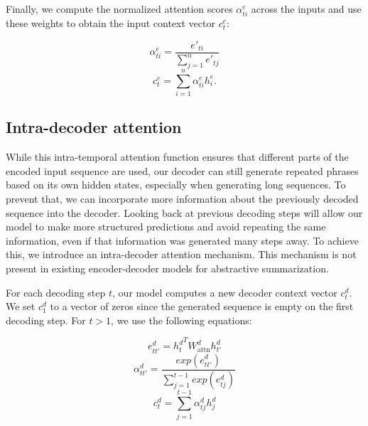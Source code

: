 \documentclass{article} \usepackage{iclr2018_arxiv,times}
\begin{document}
Finally, we compute the normalized attention scores $\alpha^e_{ti}$ across the inputs and use these weights to obtain the input context vector $c^e_t$:
\vspace{-5mm}
\begin{multicols}{2}\begin{equation}
\alpha^e_{ti} = \frac{e'_{ti}}{\sum_{j=1}^{n} e'_{tj}}
\label{eq:temporal-attention-weights-softmax}
\end{equation}\begin{equation}
c^e_t = \sum_{i=1}^{n} \alpha^e_{ti} h^e_i.
\label{eq:attention-context}
\end{equation}\end{multicols}

\subsection{Intra-decoder attention}
\label{ssec:intra-attention}

While this intra-temporal attention function ensures that different parts of the encoded input sequence are used, our decoder can still generate repeated phrases based on its own hidden states, especially when generating long sequences. To prevent that, we can incorporate more information about the previously decoded sequence into the decoder. Looking back at previous decoding steps will allow our model to make more structured predictions and avoid repeating the same information, even if that information was generated many steps away. 
To achieve this, we introduce an intra-decoder attention mechanism. This mechanism is not present in existing encoder-decoder models for abstractive summarization.

For each decoding step $t$, our model computes a new decoder context vector $c^d_t$. We set $c^d_1$ to a vector of zeros since the generated sequence is empty on the first decoding step. For $t > 1$, we use the following equations:
\vspace{-5mm}
\begin{multicols}{3}
\begin{equation}
e^d_{tt'} = {h^d_t}^T W^d_\textrm{attn} h^d_{t'}
\label{eq:intra-attention}
\end{equation}\begin{equation}
\alpha^d_{tt'} = \frac{exp(e^d_{tt'})}{\sum_{j=1}^{t-1} exp(e^d_{tj})}
\label{eq:intra-attention-weights-softmax}
\end{equation}\begin{equation}
c^d_t = \sum_{j=1}^{t-1} \alpha^d_{tj} h^d_j
\label{eq:intra-attention-context}
\end{equation}\end{multicols}
\end{document}
